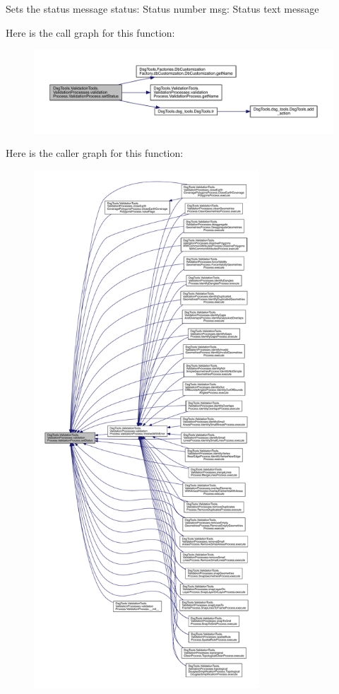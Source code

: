 \begin{DoxyVerb}Sets the status message
status: Status number
msg: Status text message
\end{DoxyVerb}
 Here is the call graph for this function\+:
\nopagebreak
\begin{figure}[H]
\begin{center}
\leavevmode
\includegraphics[width=350pt]{class_dsg_tools_1_1_validation_tools_1_1_validation_processes_1_1validation_process_1_1_validation_process_a3223ba23a7c5c3f164594a742f1dcdc2_cgraph}
\end{center}
\end{figure}
Here is the caller graph for this function\+:
\nopagebreak
\begin{figure}[H]
\begin{center}
\leavevmode
\includegraphics[height=550pt]{class_dsg_tools_1_1_validation_tools_1_1_validation_processes_1_1validation_process_1_1_validation_process_a3223ba23a7c5c3f164594a742f1dcdc2_icgraph}
\end{center}
\end{figure}
